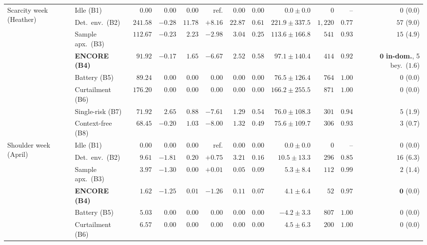 \begin{table}[t]
{\begin{tabular}{llrrrrrrrrrr}
\midrule
\multirow{8}{*}{Scarcity week (Heather)}
& Idle (B1)            & $0.00$   & $0.00$  & $0.00$   & ref. & $0.00$ & $0.00$ & $0.0 \pm 0.0$     & $0$       & --     & $0$ ($0.0$) \\
& Det.\ env.\ (B2)  & $241.58$ & $-0.28$ & $11.78$  & $+8.16$ & $22.87$ & $0.61$ & $221.9 \pm 337.5$ & $1{,}220$ & $0.77$ & $57$ ($9.0$) \\
& Sample apx.\ (B3) & $112.67$ & $-0.23$ & $2.23$   & $-2.98$ & $3.04$ & $0.25$ & $113.6 \pm 166.8$ & $541$     & $0.93$ & $15$ ($4.9$) \\
& \textbf{ENCORE (B4)} & $91.92$  & $-0.17$ & $1.65$   & $\mathbf{-6.67}$ & $2.52$ & $0.58$ & $\mathbf{97.1 \pm 140.4}$ & $414$ & $0.92$
  & $\mathbf{0}$ \textbf{in-dom.}, 5 bey.\ ($1.6$) \\
& Battery (B5)         & $89.24$  & $0.00$  & $0.00$   & $0.00$  & $0.00$ & $0.00$ & $76.5 \pm 126.4$  & $764$     & $1.00$ & $0$ ($0.0$) \\
& Curtailment (B6)     & $176.20$ & $0.00$  & $0.00$   & $0.00$  & $0.00$ & $0.00$ & $166.2 \pm 255.5$ & $871$     & $1.00$ & $0$ ($0.0$) \\
& Single-risk (B7) & $71.92$ & $2.65$ & $0.88$   & $-7.61$ & $1.29$ & $0.54$ & $76.0 \pm 108.3$  & $301$     & $0.94$ & $5$ ($1.9$) \\
& Context-free (B8)    & $68.45$  & $-0.20$ & $1.03$   & $-8.00$ & $1.32$ & $0.49$ & $75.6 \pm 109.7$  & $306$     & $0.93$ & $3$ ($0.7$) \\
\midrule
\multirow{8}{*}{Shoulder week (April)}
& Idle (B1)            & $0.00$ & $0.00$  & $0.00$ & ref. & $0.00$ & $0.00$ & $0.0 \pm 0.0$   & $0$    & --     & $0$ ($0.0$) \\
& Det.\ env.\ (B2)  & $9.61$ & $-1.81$ & $0.20$ & $+0.75$ & $3.21$ & $0.16$ & $10.5 \pm 13.3$ & $296$  & $0.85$ & $16$ ($6.3$) \\
& Sample apx.\ (B3) & $3.97$ & $-1.30$ & $0.00$ & $+0.01$ & $0.05$ & $0.09$ & $5.3 \pm 8.4$   & $112$  & $0.99$ & $2$ ($1.4$) \\
& \textbf{ENCORE (B4)} & $1.62$ & $-1.25$ & $0.01$ & $\mathbf{-1.26}$ & $0.11$ & $0.07$ & $\mathbf{4.1 \pm 6.4}$ & $52$ & $0.97$
  & $\mathbf{0}$ ($0.0$) \\
& Battery (B5)         & $5.03$ & $0.00$  & $0.00$ & $0.00$  & $0.00$ & $0.00$ & $-4.2 \pm 3.3$  & $807$  & $1.00$ & $0$ ($0.0$) \\
& Curtailment (B6)     & $6.57$ & $0.00$  & $0.00$ & $0.00$  & $0.00$ & $0.00$ & $4.5 \pm 6.3$   & $200$  & $1.00$ & $0$ ($0.0$) \\

\end{tabular}}
\end{table}
